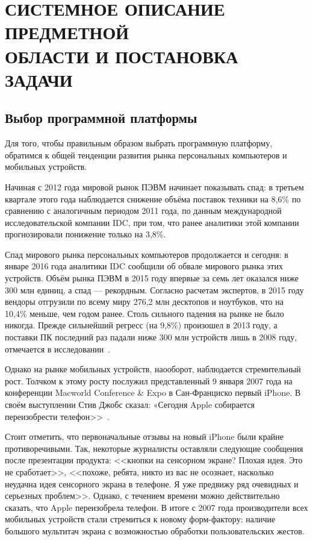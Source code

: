 \section[Системное описание предметной области и постановка задачи]{%
  СИСТЕМНОЕ ОПИСАНИЕ ПРЕДМЕТНОЙ \\
  ОБЛАСТИ И ПОСТАНОВКА ЗАДАЧИ
}\label{sec:spec}


\subsection{Выбор программной платформы}

Для того, чтобы правильным образом выбрать программную платформу, обратимся к
общей тенденции развития рынка персональных компьютеров и мобильных устройств.

Начиная с 2012 года мировой рынок ПЭВМ начинает показывать спад:
в третьем квартале этого года наблюдается снижение объёма
поставок техники на 8,6\% по сравнению с аналогичным периодом
2011 года, по данным международной исследовательской компании IDC, при том,
что ранее аналитики этой компании прогнозировали понижение только на 3,8\%.

Спад мирового рынка персональных компьютеров продолжается и сегодня: в январе 2016
года аналитики IDC сообщили об обвале мирового рынка этих устройств.
Объём рынка ПЭВМ в 2015 году впервые за семь лет оказался ниже 300 млн единиц,
а спад --- рекордным. Согласно расчетам экспертов, в 2015 году вендоры отгрузили
по всему миру 276,2 млн десктопов и ноутбуков, что на 10,4\% меньше, чем годом ранее.
Столь сильного падения на рынке не было никогда.
Прежде сильнейший регресс (на 9,8\%) произошел в 2013 году, а поставки ПК последний
раз падали ниже 300 млн устройств лишь в 2008 году,
отмечается в исследовании~\cite{computers_world_market}.

Однако на рынке мобильных устройств, наооборот, наблюдается стремительный рост.
Толчком к этому росту послужил представленный 9 января 2007 года на конференции
Macworld Conference \& Expo в Сан-Франциско первый iPhone. В своём выступлении
Стив Джобс сказал: «Сегодня Apple собирается переизобрести телефон>>~\cite{apple_reinvent_phone}.

Стоит отметить, что первоначальные отзывы на новый iPhone были крайне противоречивыми.
Так, некоторые журналисты оставляли следующие сообщения после презентации продукта:
<<кнопки на сенсорном экране? Плохая идея. Это не сработает>>,
<<похоже, ребята, никто из вас не осознает, насколько неудачна идея сенсорного
экрана в телефоне. Я уже предвижу ряд очевидных и серьезных проблем>>.
Однако, с течением времени можно действительно сказать, что Apple переизобрела телефон.
В итоге с 2007 года производители всех мобильных устройств
стали стремиться к новому форм-фактору: наличие большого мультитач экрана
с возможностью обработки пользовательских жестов.

